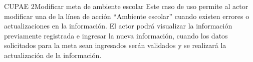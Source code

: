 \begin{UseCase}{CUPAE 2}{Modificar meta de ambiente escolar}
	{
		Este caso de uso permite al actor modificar una  de la línea de acción ``Ambiente escolar'' cuando existen errores o actualizaciones en la información. 
		El actor podrá visualizar la información previamente registrada e ingresar la nueva información, cuando los datos solicitados para la meta
		sean ingresados serán validados y se realizará la actualización de la información.
	}


\end{UseCase}
